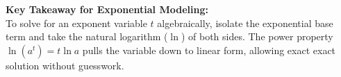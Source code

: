 \documentclass[10.5pt]{article}
\begin{document}
\begin{tcolorbox}[colback=chalkgreen!6, colframe=chalkgreen, boxrule=1pt, arc=3pt, left=8pt, right=8pt, top=4pt, bottom=4pt]
\textbf{Key Takeaway for Exponential Modeling:}\\[1pt]
To solve for an exponent variable $t$ algebraically, isolate the exponential base term and take the natural logarithm ($\ln$) of both sides. The power property $\ln(a^t) = t \ln a$ pulls the variable down to linear form, allowing exact exact solution without guesswork.
\end{tcolorbox}
\end{document}
